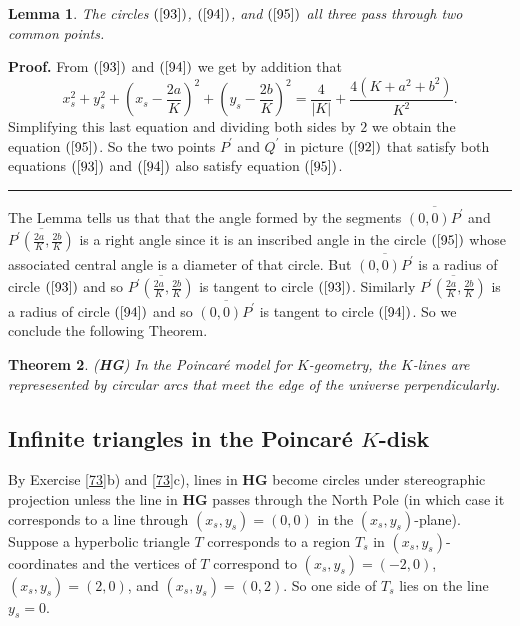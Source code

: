 \documentclass{article}%
\newtheorem{theorem}{Theorem}
\newtheorem{lemma}[theorem]{Lemma}
\newenvironment{proof}[1][Proof]{\noindent\textbf{#1.} }{\ \rule{0.5em}{0.5em}}
\begin{document}
\begin{lemma}
The circles $\left(  \ref{93}\right)  $, $\left(  \ref{94}\right)  $, and
$\left(  \ref{95}\right)  $ all three pass through two common points.
\end{lemma}

\begin{proof}
From $\left(  \ref{93}\right)  $ and $\left(  \ref{94}\right)  $ we get by
addition that%
\[
x_{s}^{2}+y_{s}^{2}+\left(  x_{s}-\frac{2a}{K}\right)  ^{2}+\left(
y_{s}-\frac{2b}{K}\right)  ^{2}=\frac{4}{\left\vert K\right\vert }%
+\frac{4\left(  K+a^{2}+b^{2}\right)  }{K^{2}}.
\]
Simplifying this last equation and dividing both sides by $2$ we obtain the
equation $\left(  \ref{95}\right)  $. So the two points $P^{\prime}$ and
$Q^{\prime}$ in picture $\left(  \ref{92}\right)  $ that satisfy both
equations $\left(  \ref{93}\right)  $ and $\left(  \ref{94}\right)  $ also
satisfy equation $\left(  \ref{95}\right)  $.
\end{proof}

The Lemma tells us that that the angle formed by the segments $\overline
{\left(  0,0\right)  P^{\prime}}$ and $\overline{P^{\prime}\left(  \frac
{2a}{K},\frac{2b}{K}\right)  }$ is a right angle since it is an inscribed
angle in the circle $\left(  \ref{95}\right)  $ whose associated central angle
is a diameter of that circle. But $\overline{\left(  0,0\right)  P^{\prime}}$
is a radius of circle $\left(  \ref{93}\right)  $ and so $\overline{P^{\prime
}\left(  \frac{2a}{K},\frac{2b}{K}\right)  }$ is tangent to circle $\left(
\ref{93}\right)  $. Similarly $\overline{P^{\prime}\left(  \frac{2a}{K}%
,\frac{2b}{K}\right)  }$ is a radius of circle $\left(  \ref{94}\right)  $ and
so $\overline{\left(  0,0\right)  P^{\prime}}$ is tangent to circle $\left(
\ref{94}\right)  $. So we conclude the following Theorem.

\begin{theorem}
(\textbf{HG}) In the Poincar\'{e} model for $K$-geometry, the $K$-lines are
represesented by circular arcs that meet the edge of the universe
perpendicularly.\pagebreak
\end{theorem}

\subsection{Infinite triangles in the Poincar\'{e} $K$-disk}

By Exercise \ref{73}b) and \ref{73}c), lines in \textbf{HG} become circles
under stereographic projection unless the line in \textbf{HG} passes through
the North Pole (in which case it corresponds to a line through $\left(
x_{s},y_{s}\right)  =\left(  0,0\right)  $ in the $\left(  x_{s},y_{s}\right)
$-plane). Suppose a hyperbolic triangle $T$ corresponds to a region $T_{s}$ in
$\left(  x_{s},y_{s}\right)  $-coordinates and the vertices of $T$ correspond
to $\left(  x_{s},y_{s}\right)  =\left(  -2,0\right)  $, $\left(  x_{s}%
,y_{s}\right)  =\left(  2,0\right)  $, and $\left(  x_{s},y_{s}\right)
=\left(  0,2\right)  $. So one side of $T_{s}$ lies on the line $y_{s}=0$.
\end{document}
